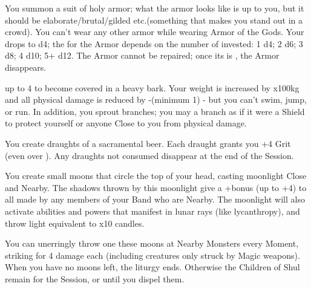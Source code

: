 \begin{multicols*}{2}
\LITURGY [
  Name = Armor of the Gods,
  Link = arcana-mystery-armor-of-the-gods,
  Paradigm = Civilized
]

You summon a suit of holy armor; what the armor looks like is up to you, but it should be elaborate/brutal/gilded etc.\@ (something that makes you stand out in a crowd). You can't wear any other armor while wearing Armor of the Gods.  Your \MD drops to d4; the \UD for the Armor depends on the number of \DICE invested: 1 d4; 2 d6; 3 d8; 4 d10; 5+ d12.  The Armor cannot be repaired; once its \UD is , the Armor disappears.

\LITURGY [
  Name = Barkskin,
  Link = arcana-mystery-barkskin,
  Paradigm = Heathen
]

 up to 4 \DICE to become covered in a heavy bark.  Your weight is increased by \DICE x100kg and all physical damage is reduced by -\DICE (minimum 1) - but you can't swim, jump, or run. In addition, you sprout \DICE branches; you may  a branch as if it were a Shield to protect yourself or anyone Close to you from physical damage.


\LITURGY [
  Name = Blessed Brew,
  Link = arcana-mystery-blessed-brew,
  Paradigm = Civilized
]

You create \DICE draughts of a sacramental beer. Each draught grants you +4 Grit (even over \MAX). Any draughts not consumed disappear at the end of the Session.

\LITURGY [
  Name = Children of Shul,
  Link = arcana-mystery-children-of-shul,
  Paradigm = Empyrean
]

You create \DICE small moons that circle the top of your head, casting moonlight Close and Nearby. The shadows thrown by this moonlight give a +\DICE bonus (up to +4) to all  made by any members of your Band who are Nearby. The moonlight will also activate abilities and powers that manifest in lunar rays (like lycanthropy), and throw light equivalent to \DICE x10 candles.

You can unerringly throw one these moons at Nearby Monsters every Moment, striking for 4 damage each (including creatures only struck by Magic weapons).  When you have no moons left, the liturgy ends. Otherwise the Children of Shul remain for the Session, or until you dispel them.

\LITURGY [
  Name = Corsair's Blade,
  Link = arcana-mystery-corsairs-blade,
  Paradigm = Errant
]


\end{multicols*}
